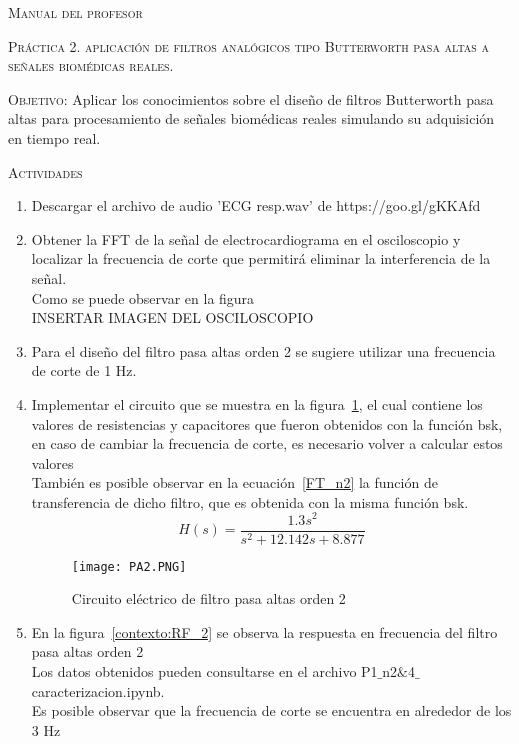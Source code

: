 \documentclass[10pt,letterpaper,spanish,twoside]{report}
\begin{document}
\docdate

\begin{center}
 \textsc{\asignatura}\vspace{.2em}
\end{center}

\textsc{Manual del profesor}

\textsc{Práctica 2. aplicación de filtros analógicos tipo Butterworth pasa altas a señales biomédicas reales.}

\textsc{Objetivo:} Aplicar los conocimientos sobre el diseño de filtros Butterworth pasa altas para procesamiento de señales biomédicas reales simulando su adquisición en tiempo real.

\textsc{Actividades}
\begin{enumerate}
 \item Descargar el archivo de audio 'ECG resp.wav' de https://goo.gl/gKKAfd
 \item Obtener la FFT de la señal de electrocardiograma en el osciloscopio y localizar la frecuencia de corte que permitirá eliminar la interferencia de la señal.\\Como se puede observar en la figura%
 \\INSERTAR IMAGEN DEL OSCILOSCOPIO 
 \item Para el diseño del filtro pasa altas orden 2 se sugiere utilizar una frecuencia de corte de 1 Hz. 
 \item Implementar el circuito que se muestra en la figura~\ref{contexto:PA2}, el cual contiene los valores de resistencias y capacitores que fueron obtenidos con la función bsk, en caso de cambiar la frecuencia de corte, es necesario volver a calcular estos valores
 \\También es posible observar en la ecuación~\eqref{FT_n2} la función de transferencia de dicho filtro, que es obtenida con la misma función bsk.
 \begin{equation}
 	H(s)=\frac{1.3s^2}{s^2+12.142s+8.877}\label{FT_n2}
 \end{equation}
 \begin{figure}[H]
 	\centering
 	\texttt{[image: PA2.PNG]}
 	\caption{Circuito eléctrico de filtro pasa altas orden 2}
	\label{contexto:PA2}
 \end{figure}
 \item En la figura~\ref{contexto:RF_2} se observa la respuesta en frecuencia del filtro pasa altas orden 2
 \\Los datos obtenidos pueden consultarse en el archivo P1$\_$n2$\&$4$\_$caracterizacion.ipynb. \\Es posible observar que la frecuencia de corte se encuentra en alrededor de los 3 Hz 

\end{enumerate}
\end{document}
